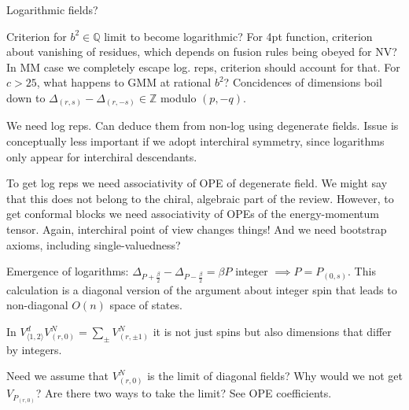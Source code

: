 \documentclass[12pt, a4paper]{article}
\theoremstyle{break}
\begin{document}
Logarithmic fields?

Criterion for $b^2\in\mathbb{Q}$ limit to become logarithmic? For 4pt function, criterion about vanishing of residues, which depends on fusion rules being obeyed for NV? In MM case we completely escape log. reps, criterion should account for that.  
For $c>25$, what happens to GMM at rational $b^2$? Concidences of dimensions boil down to $\Delta_{(r,s)}-\Delta_{(r,-s)} \in \mathbb{Z}$ modulo $(p, -q)$. 

We need log reps. Can deduce them from non-log using degenerate fields. Issue is conceptually less important if we adopt interchiral symmetry, since logarithms only appear for interchiral descendants. 

To get log reps we need associativity of OPE of degenerate field. We might say that this does not belong to the chiral, algebraic part of the review. However, to get conformal blocks we need associativity of OPEs of the energy-momentum tensor. Again, interchiral point of view changes things! And we need bootstrap axioms, including single-valuedness? 

Emergence of logarithms: $\Delta_{P+\frac{\beta}{2}}-\Delta_{P-\frac{\beta}{2}} = \beta P$ integer $\implies P=P_{(0,s)}$. This calculation is a diagonal version of the argument about integer spin that leads to non-diagonal $O(n)$ space of states.

In $V^d_{\langle 1,2\rangle}V^N_{(r,0)} = \sum_\pm V^N_{(r,\pm 1)}$ it is not just spins but also dimensions that differ by integers. 

Need we assume that $V^N_{(r,0)}$ is the limit of diagonal fields? Why would we not get $V_{P_{(r,0)}}$? Are there two ways to take the limit? See OPE coefficients. 




%
\end{document}
